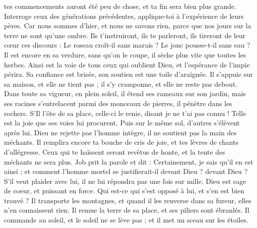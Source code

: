 \begin{multicols}{2}
tes commencements auront été peu de chose, et ta fin sera bien plus grande.
Interroge ceux des générations précédentes, applique-toi à l'expérience de leurs pères.
Car nous sommes d'hier, et nous ne savons rien, parce que nos jours sur la terre ne sont qu'une ombre.
Ils t'instruiront, ils te parleront, ils tireront de leur cœur ces discours :
Le roseau croît-il sans marais ? Le jonc pousse-t-il sans eau ?
Il est encore en sa verdure, sans qu'on le coupe, il sèche plus vite que toutes les herbes.
Ainsi est la voie de tous ceux qui oublient Dieu, et l'espérance de l'impie périra.
Sa confiance est brisée, son soutien est une toile d'araignée.
Il s'appuie sur sa maison, et elle ne tient pas ; il s'y cramponne, et elle ne reste pas debout.
Dans toute sa vigueur, en plein soleil, il étend ses rameaux sur son jardin,
mais ses racines s'entrelacent parmi des monceaux de pierres, il pénètre dans les rochers.
S'Il l'ôte de sa place, celle-ci le renie, disant je ne t'ai pas connu ! 
Telle est la joie que ses voies lui procurent. Puis sur le même sol, d'autres s'élèvent après lui.
Dieu ne rejette pas l'homme intègre, il ne soutient pas la main des méchants.
Il remplira encore ta bouche de cris de joie, et tes lèvres de chants d'allégresse.
Ceux qui te haïssent seront revêtus de honte, et la tente des méchants ne sera plus. 
\VerseOne{}Job prit la parole et dit :
Certainement, je sais qu'il en est ainsi ; et comment l'homme mortel se justifierait-il devant Dieu ?  devant Dieu ?
S'il veut plaider avec lui, il ne lui répondra pas une fois sur mille. 
 Dieu est sage de coeur, et puissant en force. Qui est-ce qui s'est opposé à lui, et s'en est bien trouvé ? 
Il transporte les montagnes, et quand il les renverse dans sa fureur, elles n'en connaissent rien.
Il remue la terre de sa place, et ses piliers sont ébranlés.
Il commande au soleil, et le soleil ne se lève pas ; et il met un sceau sur les étoiles.

\end{multicols}
